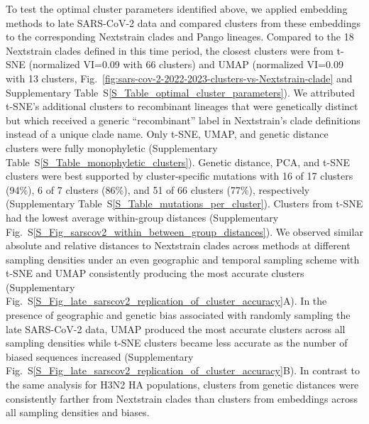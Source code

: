 \documentclass[webpdf,contemporary,large,single]{oup-authoring-template}%
\theoremstyle{thmstyleone}%
\theoremstyle{thmstyletwo}%
\theoremstyle{thmstylethree}%
\begin{document}
To test the optimal cluster parameters identified above, we applied embedding methods to late SARS-CoV-2 data and compared clusters from these embeddings to the corresponding Nextstrain clades and Pango lineages.
Compared to the 18 Nextstrain clades defined in this time period, the closest clusters were from t-SNE (normalized VI=0.09 with 66 clusters) and UMAP (normalized VI=0.09 with 13 clusters, Fig.~\ref{fig:sars-cov-2-2022-2023-clusters-vs-Nextstrain-clade} and Supplementary Table~S\ref{S_Table_optimal_cluster_parameters}).
We attributed t-SNE's additional clusters to recombinant lineages that were genetically distinct but which received a generic ``recombinant'' label in Nextstrain's clade definitions instead of a unique clade name.
Only t-SNE, UMAP, and genetic distance clusters were fully monophyletic (Supplementary Table~S\ref{S_Table_monophyletic_clusters}).
Genetic distance, PCA, and t-SNE clusters were best supported by cluster-specific mutations with 16 of 17 clusters (94\%), 6 of 7 clusters (86\%), and 51 of 66 clusters (77\%), respectively (Supplementary Table~S\ref{S_Table_mutations_per_cluster}).
Clusters from t-SNE had the lowest average within-group distances (Supplementary Fig.~S\ref{S_Fig_sarscov2_within_between_group_distances}).
We observed similar absolute and relative distances to Nextstrain clades across methods at different sampling densities under an even geographic and temporal sampling scheme with t-SNE and UMAP consistently producing the most accurate clusters (Supplementary Fig.~S\ref{S_Fig_late_sarscov2_replication_of_cluster_accuracy}A).
In the presence of geographic and genetic bias associated with randomly sampling the late SARS-CoV-2 data, UMAP produced the most accurate clusters across all sampling densities while t-SNE clusters became less accurate as the number of biased sequences increased (Supplementary Fig.~S\ref{S_Fig_late_sarscov2_replication_of_cluster_accuracy}B).
In contrast to the same analysis for H3N2 HA populations, clusters from genetic distances were consistently farther from Nextstrain clades than clusters from embeddings across all sampling densities and biases.
\end{document}
